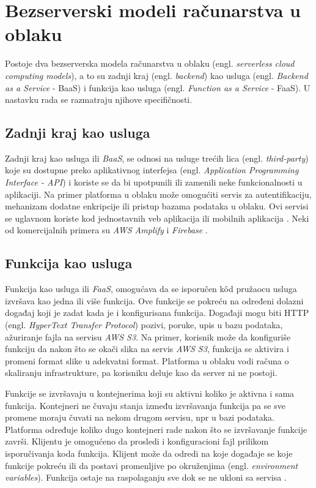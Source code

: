 \documentclass[12pt,oneside]{memoir}
\begin{document}
\section{Bezserverski modeli računarstva u oblaku}
Postoje dva bezserverska modela računarstva u oblaku (engl. \emph{serverless cloud computing models}), a to su zadnji kraj (engl. \emph{backend}) kao usluga (engl. \emph{Backend as a Service} - BaaS) i funkcija kao usluga (engl. \emph{Function as a Service} - FaaS). U nastavku rada se razmatraju njihove specifičnosti.

\subsection{Zadnji kraj kao usluga}

Zadnji kraj kao usluga ili \emph{BaaS}, se odnosi na usluge trećih lica (engl. \emph{third-party}) koje su dostupne preko aplikativnog interfejsa (engl. \emph{Application Programming Interface - API}) i koriste se da bi upotpunili ili zamenili neke funkcionalnosti u aplikaciji. Na primer platforma u oblaku može omogućiti servis za autentifikaciju, mehanizam dodatne enkripcije ili pristup bazama podataka u oblaku. Ovi servisi se uglavnom koriste kod jednostavnih veb aplikacija ili mobilnih aplikacija \cite{wis, bsa}. Neki od komercijalnih primera su \emph{AWS Amplify} i \emph{Firebase} \cite{baasp}.


\subsection{Funkcija kao usluga}
Funkcija kao usluga ili \emph{FaaS}, omogućava da se isporučen kôd pružaocu usluga izvršava kao jedna ili više funkcija. Ove funkcije se pokreću na određeni dolazni događaj koji je zadat kada je i konfigurisana funkcija. Događaji mogu biti HTTP (engl. \emph{HyperText Transfer Protocol}) pozivi, poruke, upis u bazu podataka, ažuriranje fajla na servisu \emph{AWS S3}. Na primer, korisnik može da konfiguriše funkciju da nakon što se okači slika na servis \emph{AWS S3}, funkcija se aktivira i promeni format slike u adekvatni format. Platforma u oblaku vodi računa o skaliranju infrastrukture, pa korisniku deluje kao da server ni ne postoji. 

Funkcije se izvršavaju u kontejnerima koji su aktivni koliko je aktivna i sama funkcija. Kontejneri ne čuvaju stanja između izvršavanja funkcija pa se sve promene moraju čuvati na nekom drugom servisu, npr u bazi podataka. Platforma određuje koliko dugo kontejneri rade nakon što se izvršavanje funkcije završi. Klijentu je omogućeno da prosledi i konfiguracioni fajl prilikom isporučivanja koda funkcija. Klijent može da odredi na koje događaje se koje funkcije pokreću ili da postavi promenljive po okruženjima (engl. \emph{environment variables}). Funkcija ostaje na raspolaganju sve dok se ne ukloni sa servisa \cite{bsa}.
\end{document}
